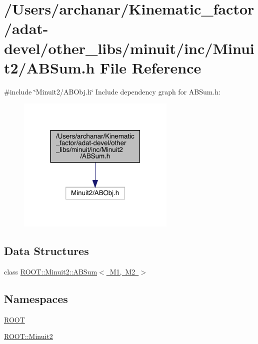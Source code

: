 \hypertarget{adat-devel_2other__libs_2minuit_2inc_2Minuit2_2ABSum_8h}{}\section{/\+Users/archanar/\+Kinematic\+\_\+factor/adat-\/devel/other\+\_\+libs/minuit/inc/\+Minuit2/\+A\+B\+Sum.h File Reference}
\label{adat-devel_2other__libs_2minuit_2inc_2Minuit2_2ABSum_8h}
{\ttfamily \#include \char`\"{}Minuit2/\+A\+B\+Obj.\+h\char`\"{}}\newline
Include dependency graph for A\+B\+Sum.\+h\+:
\nopagebreak
\begin{figure}[H]
\begin{center}
\leavevmode
\includegraphics[width=214pt]{d8/d22/adat-devel_2other__libs_2minuit_2inc_2Minuit2_2ABSum_8h__incl}
\end{center}
\end{figure}
\subsection*{Data Structures}
\begin{DoxyCompactItemize}
\item 
class \mbox{\hyperlink{classROOT_1_1Minuit2_1_1ABSum}{R\+O\+O\+T\+::\+Minuit2\+::\+A\+B\+Sum$<$ M1, M2 $>$}}
\end{DoxyCompactItemize}
\subsection*{Namespaces}
\begin{DoxyCompactItemize}
\item 
 \mbox{\hyperlink{namespaceROOT}{R\+O\+OT}}
\item 
 \mbox{\hyperlink{namespaceROOT_1_1Minuit2}{R\+O\+O\+T\+::\+Minuit2}}
\end{DoxyCompactItemize}
